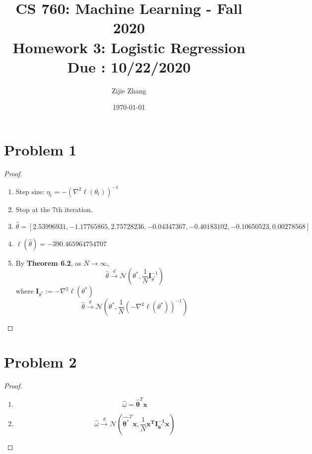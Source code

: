 \documentclass{article}
\title{CS 760: Machine Learning - Fall 2020\\
        {\Large \textbf{Homework 3: Logistic Regression}}\\
        {\normalsize \textbf{Due : 10/22/2020}}
    }
\author{Zijie Zhang}
\date{\today}
\begin{document}
    \maketitle
    
\section*{Problem 1}
    \begin{proof}
    \indent
    \begin{enumerate}[label=(\alph*)]
        \item Step size:
                $\eta_t = -\left(\nabla^2 \ell(\theta_t)\right)^{-1}$
        \item Stop at the 7th iteration.
        \item $\hat{\theta}=[  2.53996931,
                                -1.17765865,
                                2.75728236,
                                -0.04347367,
                                -0.40183102,
                                -0.10650523,
                                0.00278568
                            ]$
        \item $\ell(\hat{\theta})=-390.465964754707$
        \item By \textbf{Theorem 6.2}, as $N\to\infty$,
            $$\hat{\theta} \overset{d}{\longrightarrow} 
                \mathcal{N}\left(\theta^*, \frac{1}{N}\mathbf{I}_{\theta^*}^{-1}\right)$$
            where $\mathbf{I}_{\theta^*}:=-\nabla^2 \ell(\theta^*)$
            $$\hat{\theta} \overset{d}{\longrightarrow} 
            \mathcal{N}\left(\theta^*, \frac{1}{N}\left(-\nabla^2 \ell(\theta^*)\right)^{-1}\right)$$
    \end{enumerate}
    \end{proof}

\section*{Problem 2}
    \begin{proof}
    \indent
    \begin{enumerate}[label=(\alph*)]
        \item $$\hat{\omega}=\mathbf{\hat{\theta}}^T \mathbf{x}$$
        \item $$\hat{\omega} \overset{d}{\longrightarrow}
                \mathcal{N}\left(\mathbf{\hat{\theta^*}}^T \mathbf{x},
                \frac{1}{N}\mathbf{x^T}\mathbf{I_{\theta^*}^{-1}}\mathbf{x}\right)$$
    \end{enumerate}
    \end{proof}
\pagebreak
\end{document}
